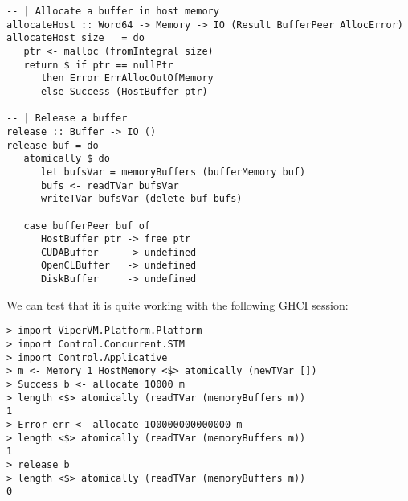 \begin{lstlisting}
-- | Allocate a buffer in host memory
allocateHost :: Word64 -> Memory -> IO (Result BufferPeer AllocError)
allocateHost size _ = do
   ptr <- malloc (fromIntegral size)
   return $ if ptr == nullPtr
      then Error ErrAllocOutOfMemory
      else Success (HostBuffer ptr)

-- | Release a buffer
release :: Buffer -> IO ()
release buf = do
   atomically $ do
      let bufsVar = memoryBuffers (bufferMemory buf)
      bufs <- readTVar bufsVar
      writeTVar bufsVar (delete buf bufs)

   case bufferPeer buf of
      HostBuffer ptr -> free ptr
      CUDABuffer     -> undefined
      OpenCLBuffer   -> undefined
      DiskBuffer     -> undefined
\end{lstlisting}

We can test that it is quite working with the following GHCI session:
\begin{lstlisting}
> import ViperVM.Platform.Platform
> import Control.Concurrent.STM
> import Control.Applicative
> m <- Memory 1 HostMemory <$> atomically (newTVar [])
> Success b <- allocate 10000 m
> length <$> atomically (readTVar (memoryBuffers m))
1
> Error err <- allocate 100000000000000 m
> length <$> atomically (readTVar (memoryBuffers m))
1
> release b
> length <$> atomically (readTVar (memoryBuffers m))
0
\end{lstlisting}
